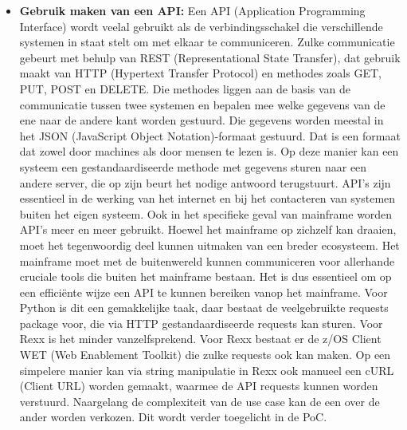 \begin{itemize}
    \item \textbf{Gebruik maken van een API:} Een API (Application Programming Interface) wordt veelal gebruikt als de verbindingsschakel die verschillende systemen in staat stelt om met elkaar te communiceren. Zulke communicatie gebeurt met behulp van REST (Representational State Transfer), dat gebruik maakt van HTTP (Hypertext Transfer Protocol) en methodes zoals GET, PUT, POST en DELETE. Die methodes liggen aan de basis van de communicatie tussen twee systemen en bepalen mee welke gegevens van de ene naar de andere kant worden gestuurd. Die gegevens worden meestal in het JSON (JavaScript Object Notation)-formaat gestuurd. Dat is een formaat dat zowel door machines als door mensen te lezen is. Op deze manier kan een systeem een gestandaardiseerde methode met gegevens sturen naar een andere server, die op zijn beurt het nodige antwoord terugstuurt. API's zijn essentieel in de werking van het internet en bij het contacteren van systemen buiten het eigen systeem. Ook in het specifieke geval van mainframe worden API's meer en meer gebruikt. Hoewel het mainframe op zichzelf kan draaien, moet het tegenwoordig deel kunnen uitmaken van een breder ecosysteem. Het mainframe moet met de buitenwereld kunnen communiceren voor allerhande cruciale tools die buiten het mainframe bestaan. Het is dus essentieel om op een efficiënte wijze een API te kunnen bereiken vanop het mainframe. Voor Python is dit een gemakkelijke taak, daar bestaat de veelgebruikte requests package voor, die via HTTP gestandaardiseerde requests kan sturen. Voor Rexx is het minder vanzelfsprekend. Voor Rexx bestaat er de z/OS Client WET (Web Enablement Toolkit) die zulke requests ook kan maken. Op een simpelere manier kan via string manipulatie in Rexx ook manueel een cURL (Client URL) worden gemaakt, waarmee de API requests kunnen worden verstuurd. Naargelang de complexiteit van de use case kan de een over de ander worden verkozen. Dit wordt verder toegelicht in de PoC.

\end{itemize}
